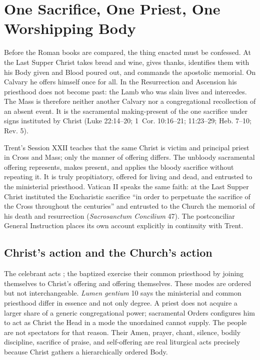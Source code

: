 \section{One Sacrifice, One Priest, One Worshipping Body}

Before the Roman books are compared, the thing enacted must be confessed. At the Last Supper Christ takes bread and wine, gives thanks, identifies them with his Body given and Blood poured out, and commands the apostolic memorial. On Calvary he offers himself once for all. In the Resurrection and Ascension his priesthood does not become past: the Lamb who was slain lives and intercedes. The Mass is therefore neither another Calvary nor a congregational recollection of an absent event. It is the sacramental making-present of the one sacrifice under signs instituted by Christ (Luke 22:14--20; 1~Cor. 10:16--21; 11:23--29; Heb. 7--10; Rev. 5).

Trent's Session XXII teaches that the same Christ is victim and principal priest in Cross and Mass; only the manner of offering differs. The unbloody sacramental offering represents, makes present, and applies the bloody sacrifice without repeating it. It is truly propitiatory, offered for living and dead, and entrusted to the ministerial priesthood. Vatican II speaks the same faith: at the Last Supper Christ instituted the Eucharistic sacrifice “in order to perpetuate the sacrifice of the Cross throughout the centuries” and entrusted to the Church the memorial of his death and resurrection (\emph{Sacrosanctum Concilium} 47). The postconciliar General Instruction places its own account explicitly in continuity with Trent.

\subsection{Christ's action and the Church's action}

The celebrant acts ; the baptized exercise their common priesthood by joining themselves to Christ's offering and offering themselves. These modes are ordered but not interchangeable. \emph{Lumen gentium} 10 says the ministerial and common priesthood differ in essence and not only degree. A priest does not acquire a larger share of a generic congregational power; sacramental Orders configures him to act as Christ the Head in a mode the unordained cannot supply. The people are not spectators for that reason. Their Amen, prayer, chant, silence, bodily discipline, sacrifice of praise, and self-offering are real liturgical acts precisely because Christ gathers a hierarchically ordered Body.

